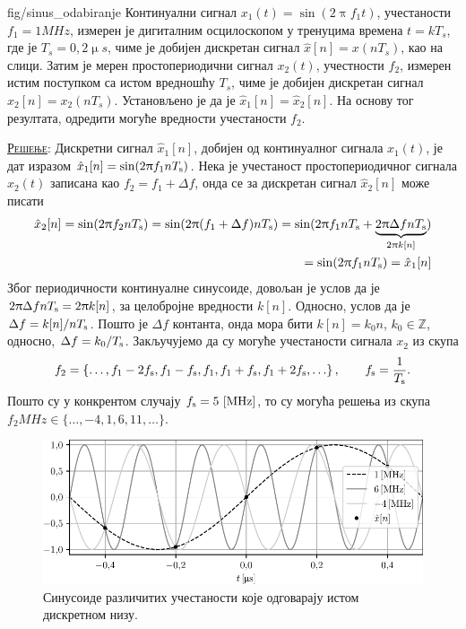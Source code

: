 \noindent
\begin{slikaDesno}{fig/sinus_odabiranje}
    \PID Континуални сигнал $x_1(t) = \sin(2\uppi f_1 t)$, учестаности $f_1 = 1\unit{MHz}$, измерен је 
    дигиталним осцилоскопом у тренуцима времена
    $t = kT_s$, где је ${T_s = 0,2\unit{\upmu s}}$, чиме је добијен дискретан сигнал $\hat x[n] = x(nT_s)$, као на слици.
    Затим је мерен простопериодични сигнал $x_2(t)$, учестности $f_2$, измерен истим поступком 
    са истом вредношћу $T_s$, чиме је добијен дискретан сигнал $\hat x_2[n] = x_2(nT_s)$. 
    Установљено је да је $\hat x_1[n] = \hat x_2[n]$. 
    На основу тог резултата, одредити могуће вредности учестаности $f_2$.
\end{slikaDesno}

\textsc{\underline{Решење}}:
Дискретни сигнал $\hat x_1[n]$, добијен од континуалног сигнала $x_1(t)$, је дат изразом 
$
\hat x_1[n] = \sin(2\uppi f_1 n T_{\rm s}) 
$. Нека је учестаност простопериодичног сигнала $x_2(t)$ записана као $f_2 = f_1 + \Delta f$, онда се за дискретан сигнал 
$\hat x_2[n]$ може писати
\begin{eqnarray}
    \hat x_2[n] = \sin(2\uppi f_2 nT_{\rm s}) = \sin(2\uppi (f_1 + \Delta f) nT_{\rm s}) 
    = \sin(2\uppi f_1 n T_{\rm s} + \underbrace{2\uppi \Delta f n T_{\rm s}}_{2\uppi k[n]}  ) \\
    = \sin(2\uppi f_1 n T_{\rm s}) = \hat x_1[n]
\end{eqnarray}
Због периодичности континуалне синусоиде, довољан је услов да је $2\uppi \Delta f n T_{\rm s} = 2\uppi k[n]$, за целобројне вредности $k[n]$.
Односно, услов да је $\Delta f = k[n]/nT_{\rm s}$. Пошто је $\Delta f$ контанта, онда мора бити $k[n] = k_0 n$, 
$k_0 \in \mathbb Z$, односно, $\Delta f = k_0/T_{\rm s}$. Закључујемо да су  могуће учестаности сигнала $x_2$
из скупа
\begin{eqnarray}
    f_2 = \left\{
    \ldots,
    f_1 - 2 f_{\rm s},
    f_1 - f_{\rm s},
    f_1,
    f_1 + f_{\rm s},
    f_1 + 2 f_{\rm s},
    \ldots
    \right\}, \qquad f_{\rm s} = \dfrac{1}{T_{\rm s}}.
\end{eqnarray}
Пошто су у конкрентом случају $f_{\rm s} = 5\,\left[\mathrm{MHz}\right]$, то су могућа решења из скупа
$f_2\unit{MHz} \in \{\ldots, -4 ,1, 6, 11, \ldots\}$.

\begin{figure}[ht!]
    \includegraphics{fig/sinus_odabiranje_rekonstrukcija.pdf}
    \caption{Синусоиде различитих учестаности које одговарају истом дискретном низу.}
\end{figure}

